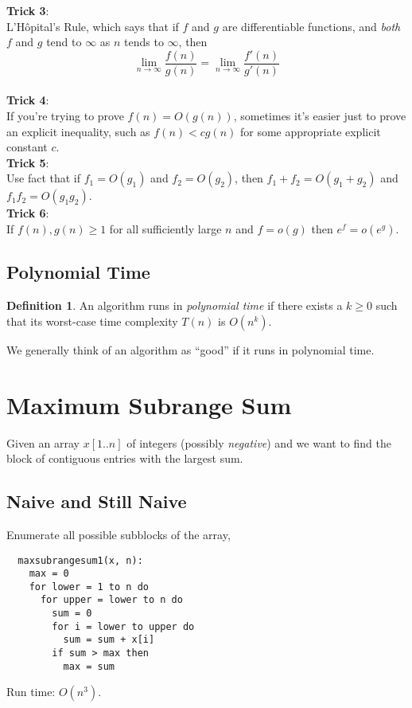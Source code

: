 \documentclass[12pt]{article}
\theoremstyle{plain}
\theoremstyle{definition}
\newtheorem*{defn*}{Definition}
\begin{document}
\medskip \textbf{Trick 3}: \\
L'H\^opital's Rule, which says that if $f$ and $g$ are differentiable functions, and \emph{both} $f$ and $g$ tend to $\infty$ as $n$ tends to $\infty$, then
$$\lim_{n\to\infty}\frac{f(n)}{g(n)} = \lim_{n\to\infty}\frac{f'(n)}{g'(n)}$$ \\

\textbf{Trick 4}: \\
If you're trying to prove $f(n) = O(g(n))$, sometimes it's easier just to prove an explicit inequality, such as $f(n) < cg(n)$ for some appropriate explicit constant $c$. \\

\medskip \textbf{Trick 5}: \\
Use fact that if $f_{1} = O(g_{1})$ and $f_{2} = O(g_{2})$, then $f_{1} + f_{2} = O(g_{1} + g_{2})$ and $f_{1}f_{2} = O(g_{1}g_{2})$. \\

\medskip \textbf{Trick 6}: \\
If $f(n), g(n) \geq 1$ for all sufficiently large $n$ and $f = o(g)$ then $e^{f} = o(e^{g})$.

\subsection{Polynomial Time}
\begin{defn*}
An algorithm runs in \emph{polynomial time} if there exists a $k \geq 0$ such that its worst-case time complexity $T(n)$ is $O(n^{k})$.
\end{defn*}

We generally think of an algorithm as ``good'' if it runs in polynomial time.

\newpage
\section{Maximum Subrange Sum}
Given an array $x[1..n]$ of integers (possibly \emph{negative}) and we want to find the block of contiguous entries with the largest sum.

\subsection{Naive and Still Naive}
Enumerate all possible subblocks of the array,
\begin{verbatim}
  maxsubrangesum1(x, n):
    max = 0
    for lower = 1 to n do
      for upper = lower to n do
        sum = 0
        for i = lower to upper do
          sum = sum + x[i]
        if sum > max then
          max = sum
\end{verbatim}
Run time: $O(n^{3})$. \\
\end{document}
